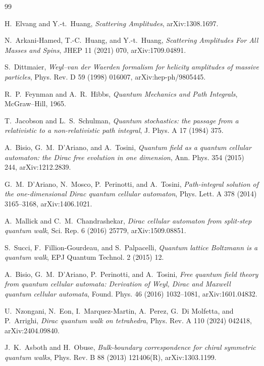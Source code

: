 \documentclass[11pt]{article}
\begin{document}
\begin{thebibliography}{99}

H.~Elvang and Y.-t.~Huang,
\emph{Scattering Amplitudes}, arXiv:1308.1697.

N.~Arkani-Hamed, T.-C.~Huang, and Y.-t.~Huang,
\emph{Scattering Amplitudes For All Masses and Spins},
JHEP 11 (2021) 070, arXiv:1709.04891.

S.~Dittmaier,
\emph{Weyl--van der Waerden formalism for helicity amplitudes of massive
particles}, Phys. Rev. D 59 (1998) 016007, arXiv:hep-ph/9805445.

R.~P.~Feynman and A.~R.~Hibbs,
\emph{Quantum Mechanics and Path Integrals}, McGraw--Hill, 1965.

T.~Jacobson and L.~S.~Schulman,
\emph{Quantum stochastics: the passage from a relativistic to a
non-relativistic path integral}, J. Phys. A 17 (1984) 375.

A.~Bisio, G.~M.~D'Ariano, and A.~Tosini,
\emph{Quantum field as a quantum cellular automaton: the Dirac free evolution
in one dimension}, Ann. Phys. 354 (2015) 244, arXiv:1212.2839.

G.~M.~D'Ariano, N.~Mosco, P.~Perinotti, and A.~Tosini,
\emph{Path-integral solution of the one-dimensional Dirac quantum cellular
automaton}, Phys. Lett. A 378 (2014) 3165--3168, arXiv:1406.1021.

A.~Mallick and C.~M.~Chandrashekar,
\emph{Dirac cellular automaton from split-step quantum walk},
Sci. Rep. 6 (2016) 25779, arXiv:1509.08851.

S.~Succi, F.~Fillion-Gourdeau, and S.~Palpacelli,
\emph{Quantum lattice Boltzmann is a quantum walk},
EPJ Quantum Technol. 2 (2015) 12.

A.~Bisio, G.~M.~D'Ariano, P.~Perinotti, and A.~Tosini,
\emph{Free quantum field theory from quantum cellular automata: Derivation of
Weyl, Dirac and Maxwell quantum cellular automata},
Found. Phys. 46 (2016) 1032--1081, arXiv:1601.04832.

U.~Nzongani, N.~Eon, I.~Marquez-Martin, A.~Perez, G.~Di Molfetta, and
P.~Arrighi,
\emph{Dirac quantum walk on tetrahedra},
Phys. Rev. A 110 (2024) 042418, arXiv:2404.09840.

J.~K.~Asboth and H.~Obuse,
\emph{Bulk-boundary correspondence for chiral symmetric quantum walks},
Phys. Rev. B 88 (2013) 121406(R), arXiv:1303.1199.


\end{thebibliography}
\end{document}
